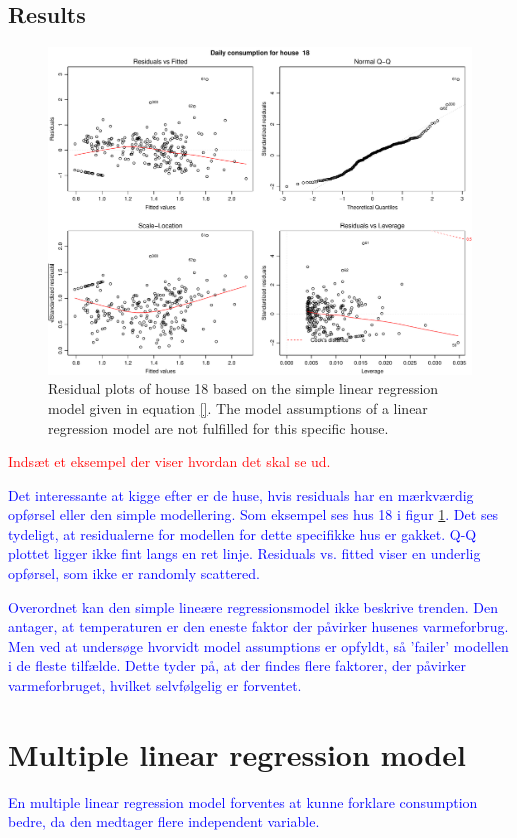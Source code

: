 \subsection{Results}
\begin{figure}
    \centering
    \includegraphics[width=1.\textwidth]{../../../figures/simple_lm18.pdf}
    \caption{Residual plots of house 18 based on the simple linear regression model given in equation \eqref{}. The model assumptions of a linear regression model are not fulfilled for this specific house.}
    \label{fig: simple_lm_18}
\end{figure}
\textcolor{red}{Indsæt et eksempel der viser hvordan det skal se ud.}

\textcolor{blue}{Det interessante at kigge efter er de huse, hvis residuals har en mærkværdig opførsel eller den simple modellering. Som eksempel ses hus 18 i figur \ref{fig: simple_lm_18}. Det ses tydeligt, at residualerne for modellen for dette specifikke hus er gakket. Q-Q plottet ligger ikke fint langs en ret linje. Residuals vs. fitted viser en underlig opførsel, som ikke er randomly scattered.}

\noindent \textcolor{blue}{Overordnet kan den simple lineære regressionsmodel ikke beskrive trenden. Den antager, at temperaturen er den eneste faktor der påvirker husenes varmeforbrug. Men ved at undersøge hvorvidt model assumptions er opfyldt, så 'failer' modellen i de fleste tilfælde. Dette tyder på, at der findes flere faktorer, der påvirker varmeforbruget, hvilket selvfølgelig er forventet.}

\section{Multiple linear regression model}
\textcolor{blue}{En multiple linear regression model forventes at kunne forklare consumption bedre, da den medtager flere independent variable. }

